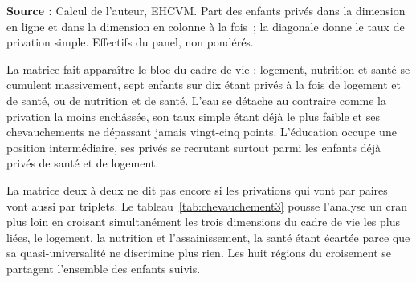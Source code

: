 \begin{table}[H]
  \centering
  \caption{Chevauchement des privations deux à deux à la période de base (\%)}
  \label{tab:chevauchement}
  \nozebre
  \small

  {\footnotesize \textbf{Source :} Calcul de l'auteur, EHCVM. Part des
  enfants privés dans la dimension en ligne et dans la dimension en
  colonne à la fois~; la diagonale donne le taux de privation simple.
  Effectifs du panel, non pondérés.}
\end{table}

La matrice fait apparaître le bloc du cadre de vie : logement, nutrition
et santé se cumulent massivement, sept enfants sur dix étant privés à la
fois de logement et de santé, ou de nutrition et de santé. L'eau se
détache au contraire comme la privation la moins enchâssée, son taux
simple étant déjà le plus faible et ses chevauchements ne dépassant
jamais vingt-cinq points. L'éducation occupe une position intermédiaire,
ses privés se recrutant surtout parmi les enfants déjà privés de santé et
de logement.

La matrice deux à deux ne dit pas encore si les privations qui vont par
paires vont aussi par triplets. Le tableau~\ref{tab:chevauchement3}
pousse l'analyse un cran plus loin en croisant simultanément les trois
dimensions du cadre de vie les plus liées, le logement, la nutrition et
l'assainissement, la santé étant écartée parce que sa quasi-universalité
ne discrimine plus rien. Les huit régions du croisement se partagent
l'ensemble des enfants suivis.

